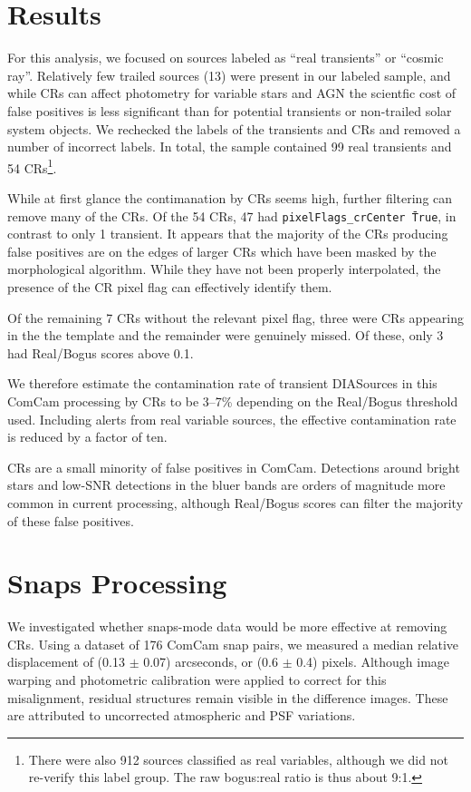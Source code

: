 \documentclass[DM,lsstdraft,authoryear,toc]{lsstdoc}
\begin{document}
\section{Results} \label{sec:results}

For this analysis, we focused on sources labeled as ``real transients'' or ``cosmic ray''.
Relatively few trailed sources (13) were present in our labeled sample, and while CRs can affect photometry for variable stars and AGN the scientfic cost of false positives is less significant than for potential transients or non-trailed solar system objects.
We rechecked the labels of the transients and CRs and removed a number of incorrect labels.
In total, the sample contained 99 real transients and 54 CRs\footnote{There were also 912 sources classified as real variables, although we did not re-verify this label group.  
The raw bogus:real ratio is thus about 9:1.}.

While at first glance the contimanation by CRs seems high, further filtering can remove many of the CRs.
Of the 54 CRs, 47 had \texttt{pixelFlags\_crCenter \= True}, in contrast to only 1 transient.
It appears that the majority of the CRs producing false positives are on the edges of larger CRs which have been masked by the morphological algorithm.
While they have not been properly interpolated, the presence of the CR pixel flag can effectively identify them.

Of the remaining 7 CRs without the relevant pixel flag, three were CRs appearing in the the template and the remainder were genuinely missed.
Of these, only 3 had Real/Bogus scores above 0.1.

We therefore estimate the contamination rate of transient DIASources in this ComCam processing by CRs to be 3--7\% depending on the Real/Bogus threshold used.
Including alerts from real variable sources, the effective contamination rate is reduced by a factor of ten.

CRs are a small minority of false positives in ComCam.
Detections around bright stars and low-SNR detections in the bluer bands are orders of magnitude more common in current processing, although Real/Bogus scores can filter the majority of these false positives.

\section{Snaps Processing}

We investigated whether snaps-mode data would be more effective at removing CRs.
Using a dataset of 176 ComCam snap pairs, we measured a median relative displacement of (0.13 $\pm$ 0.07) arcseconds, or (0.6 $\pm$ 0.4) pixels. 
Although image warping and photometric calibration were applied to correct
for this misalignment, residual structures remain visible in the difference images.  
These are attributed to uncorrected atmospheric and PSF variations.
\end{document}
